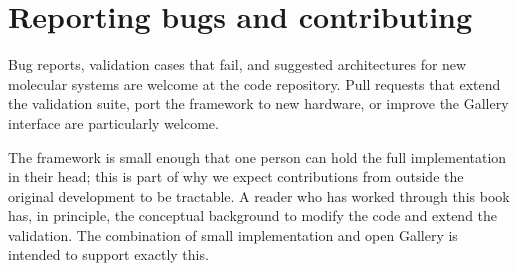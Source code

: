 \section{Reporting bugs and contributing}\label{sec:bugs}

Bug reports, validation cases that fail, and suggested architectures for new molecular systems are welcome at the code repository. Pull requests that extend the validation suite, port the framework to new hardware, or improve the Gallery interface are particularly welcome.

The framework is small enough that one person can hold the full implementation in their head; this is part of why we expect contributions from outside the original development to be tractable. A reader who has worked through this book has, in principle, the conceptual background to modify the code and extend the validation. The combination of small implementation and open Gallery is intended to support exactly this.

